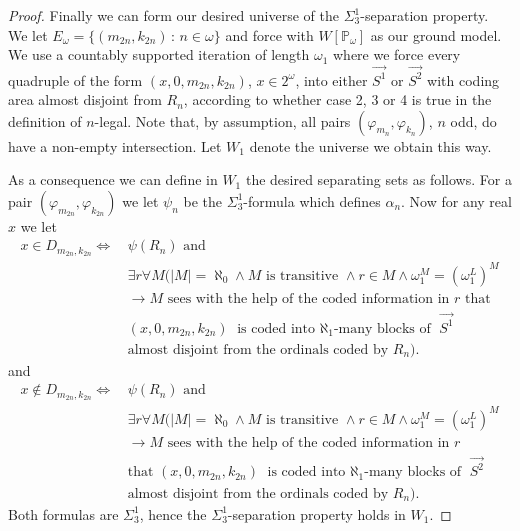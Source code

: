 \documentclass[10pt,a4paper]{amsart}
\newcommand{\forceP}{\mathbb{P}}
\begin{document}
\begin{proof}
Finally we can form our desired universe of the $\Sigma^1_3$-separation property. We let $E_{\omega} = \{(m_{2n},k_{2n}) \,: \, n \in \omega\}$ and force with $W[\forceP_{\omega}]$ as our ground model.  We use a countably supported iteration of length $\omega_1$ where we force every quadruple of the form $(x,0,m_{2n},k_{2n})$, $x \in 2^{\omega}$, into either $\vec{S^1}$ or $\vec{S^2}$ with coding area almost disjoint from $ R_{n}$, according to whether case 2, 3 or 4 is true in the definition of $n$-legal. Note that, by assumption, all pairs $(\varphi_{m_n}, \varphi_{k_n})$, $n$ odd, do have a non-empty intersection.  Let $W_1$ denote the universe we obtain this way.

As a consequence we can define in $W_1$ the desired separating sets as follows.
For a pair $(\varphi_{m_{2n}},\varphi_{k_{2n}})$ we let $\psi_{n}$ be the $\Sigma^1_3$-formula which defines $\alpha_{n}$. Now for any real $x$  we let 
\begin{align*}
x \in D_{m_{2n},k_{2n}} \Leftrightarrow \, &\psi(R_{n}) \text{ and } \\& \exists r \forall M (|M|=\aleph_0 \land M \text{ is transitive } \land r \in M \land \omega_1^M=(\omega_1^L)^M  \\&\rightarrow M \text{ sees with the help of the coded information in } r \text{ that }\\& (x,0,m_{2n},k_{2n})  \text{ is coded into $\aleph_1$-many blocks of } \vec{S^1} \\& \text{almost disjoint from the ordinals coded by }  R_{n}).
\end{align*}
and
\begin{align*}
x \notin D_{m_{2n},k_{2n}} \Leftrightarrow \, &\psi(R_{n}) \text{ and } \\& \exists r \forall M (|M|=\aleph_0 \land M \text{ is transitive } \land r \in M \land \omega_1^M=(\omega_1^L)^M  \\&\rightarrow M \text{ sees with the help of the coded information in } r \\& \text{that } (x,0,m_{2n},k_{2n})  \text{ is coded into $\aleph_1$-many blocks of } \vec{S^2} \\&\text{almost disjoint from the ordinals coded by }  R_{n}).
\end{align*}
Both formulas are $\Sigma^1_3$, hence the $\Sigma^1_3$-separation property holds in $W_1$.

\end{proof}
\end{document}
